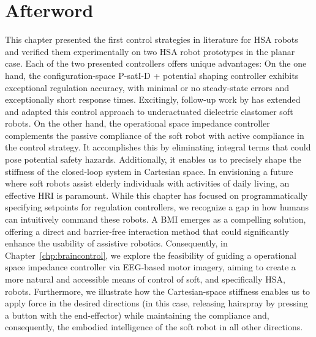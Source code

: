 \section*{Afterword}
This chapter presented the first control strategies in literature for \gls{HSA} robots and verified them experimentally on two \gls{HSA} robot prototypes in the planar case.
Each of the two presented controllers offers unique advantages:
On the one hand, the configuration-space P-satI-D + potential shaping controller exhibits exceptional regulation accuracy, with minimal or no steady-state errors and exceptionally short response times.
Excitingly, follow-up work by \citet{soleti2025model} has extended and adapted this control approach to underactuated dielectric elastomer soft robots.
On the other hand, the operational space impedance controller complements the passive compliance of the soft robot with active compliance in the control strategy. It accomplishes this by eliminating integral terms that could pose potential safety hazards. Additionally, it enables us to precisely shape the stiffness of the closed-loop system in Cartesian space.
In envisioning a future where soft robots assist elderly individuals with activities of daily living, an effective \gls{HRI} is paramount. While this chapter has focused on programmatically specifying setpoints for regulation controllers, we recognize a gap in how humans can intuitively command these robots. A \gls{BMI} emerges as a compelling solution, offering a direct and barrier-free interaction method that could significantly enhance the usability of assistive robotics. Consequently, in Chapter~\ref{chp:braincontrol}, we explore the feasibility of guiding a operational space impedance controller via \gls{EEG}-based motor imagery, aiming to create a more natural and accessible means of control of soft, and specifically \gls{HSA}, robots.
Furthermore, we illustrate how the Cartesian-space stiffness enables us to apply force in the desired directions (in this case, releasing hairspray by pressing a button with the end-effector) while maintaining the compliance and, consequently, the embodied intelligence of the soft robot in all other directions.